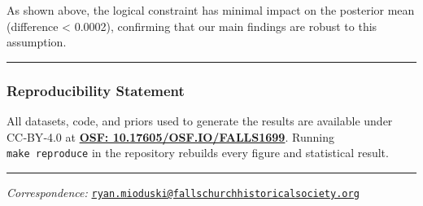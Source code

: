 \documentclass[
  11pt,
]{article}
\begin{document}
As shown above, the logical constraint has minimal impact on the
posterior mean (difference \textless{} 0.0002), confirming that our main
findings are robust to this assumption.

\begin{center}\rule{0.5\linewidth}{0.5pt}\end{center}

\subsubsection{Reproducibility
Statement}\label{reproducibility-statement}

All datasets, code, and priors used to generate the results are
available under CC‑BY‑4.0 at \textbf{\href{https://osf.io/}{OSF:
10.17605/OSF.IO/FALLS1699}}. Running \texttt{make\ reproduce} in the
repository rebuilds every figure and statistical result.

\begin{center}\rule{0.5\linewidth}{0.5pt}\end{center}

\emph{Correspondence:}
\href{mailto:ryan.mioduski@fallschurchhistoricalsociety.org}{\nolinkurl{ryan.mioduski@fallschurchhistoricalsociety.org}}
\end{document}
